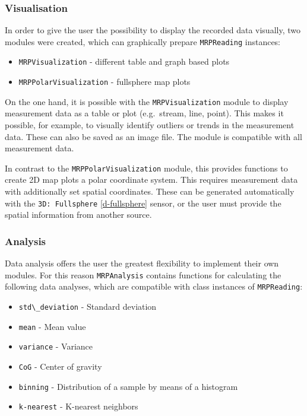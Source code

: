 \hypertarget{visualisation}{%
\subsubsection{Visualisation}\label{visualisation}}

In order to give the user the possibility to display the recorded data
visually, two modules were created, which can graphically prepare
\passthrough{\lstinline!MRPReading!} instances:

\begin{itemize}
\tightlist
\item
  \passthrough{\lstinline!MRPVisualization!} - different table and graph
  based plots
\item
  \passthrough{\lstinline!MRPPolarVisualization!} - fullsphere map plots
\end{itemize}

On the one hand, it is possible with the
\passthrough{\lstinline!MRPVisualization!} module to display measurement
data as a table or plot (e.g.~stream, line, point). This makes it
possible, for example, to visually identify outliers or trends in the
measurement data. These can also be saved as an image file. The module
is compatible with all measurement data.

In contrast to the \passthrough{\lstinline!MRPPolarVisualization!}
module, this provides functions to create 2D map plots a polar
coordinate system. This requires measurement data with additionally set
spatial coordinates. These can be generated automatically with the
\passthrough{\lstinline!3D: Fullsphere!} \ref{d-fullsphere} sensor, or
the user must provide the spatial information from another source.

\hypertarget{analysis}{%
\subsubsection{Analysis}\label{analysis}}

Data analysis offers the user the greatest flexibility to implement
their own modules. For this reason \passthrough{\lstinline!MRPAnalysis!}
contains functions for calculating the following data analyses, which
are compatible with class instances of
\passthrough{\lstinline!MRPReading!}:

\begin{itemize}
\tightlist
\item
  \passthrough{\lstinline!std\_deviation!} - Standard deviation
\item
  \passthrough{\lstinline!mean!} - Mean value
\item
  \passthrough{\lstinline!variance!} - Variance
\item
  \passthrough{\lstinline!CoG!} - Center of gravity
\item
  \passthrough{\lstinline!binning!} - Distribution of a sample by means
  of a histogram
\item
  \passthrough{\lstinline!k-nearest!} - K-nearest neighbors
\end{itemize}

